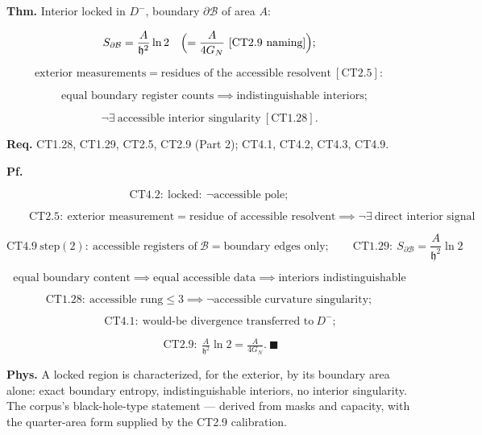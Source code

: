 \begin{theorem}\label{tag:CT4-8}
\textbf{Thm.} Interior locked in $D^-$, boundary $\partial\mathcal B$ of area $A$:

\[
S_{\partial\mathcal B}=\frac{A}{\mathfrak h^2}\ln2\quad\Bigl(=\frac{A}{4G_N}\ [\mathrm{CT2.9}\ \text{naming}]\Bigr);
\]

\[
\text{exterior measurements}=\text{residues of the accessible resolvent}\ [\mathrm{CT2.5}]:
\]

\[
\quad \text{equal boundary register counts}\implies\text{indistinguishable interiors};
\]

\[
\neg\exists\ \text{accessible interior singularity}\ [\mathrm{CT1.28}].
\]

\textbf{Req.} CT1.28, CT1.29, CT2.5, CT2.9 (Part 2); CT4.1, CT4.2, CT4.3, CT4.9.

\textbf{Pf.}

\[
\mathrm{CT4.2}:\ \text{locked}:\ \neg\text{accessible pole};
\]

\[
\qquad \mathrm{CT2.5}:\ \text{exterior measurement}=\text{residue of accessible resolvent}\implies\neg\exists\ \text{direct interior signal}
\]

\[
\mathrm{CT4.9}\ \text{step}(2):\ \text{accessible registers of}\ \mathcal B=\text{boundary edges only};\qquad
\mathrm{CT1.29}:\ S_{\partial\mathcal B}=\frac{A}{\mathfrak h^2}\ln2
\]

\[
\text{equal boundary content}\implies\text{equal accessible data}\implies\text{interiors indistinguishable}
\]

\[
\mathrm{CT1.28}:\ \text{accessible rung}\le3\implies\neg\text{accessible curvature singularity};
\]

\[
\qquad \mathrm{CT4.1}:\ \text{would-be divergence transferred to}\ D^-;
\]

\[
\qquad \mathrm{CT2.9}:\ \tfrac{A}{\mathfrak h^2}\ln2=\tfrac{A}{4G_N}.\ \blacksquare
\]

\textbf{Phys.} A locked region is characterized, for the exterior, by its boundary area alone: exact boundary entropy, indistinguishable interiors, no interior singularity. The corpus’s black-hole-type statement — derived from masks and capacity, with the quarter-area form supplied by the CT2.9 calibration.

\end{theorem}

